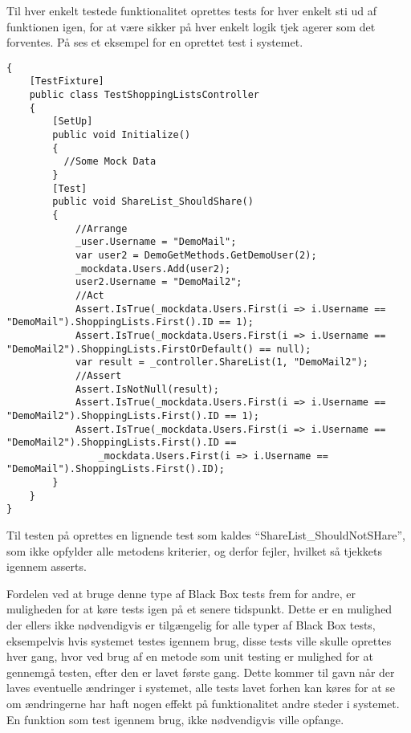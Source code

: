Til hver enkelt testede funktionalitet oprettes tests for hver enkelt sti ud af funktionen igen, for at være sikker på hver enkelt logik tjek agerer som det forventes.
På  ses et eksempel for en oprettet test i systemet.

\begin{lstlisting}
{
    [TestFixture]
    public class TestShoppingListsController
    {
		[SetUp]
        public void Initialize()
        {
          //Some Mock Data
        }
        [Test]
        public void ShareList_ShouldShare()
        {
            //Arrange
            _user.Username = "DemoMail";
            var user2 = DemoGetMethods.GetDemoUser(2);
            _mockdata.Users.Add(user2); 
            user2.Username = "DemoMail2";
            //Act
            Assert.IsTrue(_mockdata.Users.First(i => i.Username == "DemoMail").ShoppingLists.First().ID == 1);
            Assert.IsTrue(_mockdata.Users.First(i => i.Username == "DemoMail2").ShoppingLists.FirstOrDefault() == null);
            var result = _controller.ShareList(1, "DemoMail2");
            //Assert
            Assert.IsNotNull(result);
            Assert.IsTrue(_mockdata.Users.First(i => i.Username == "DemoMail2").ShoppingLists.First().ID == 1);
            Assert.IsTrue(_mockdata.Users.First(i => i.Username == "DemoMail2").ShoppingLists.First().ID == 
                _mockdata.Users.First(i => i.Username == "DemoMail").ShoppingLists.First().ID);
        }
    }
}        
\end{lstlisting}\label{lsttest}
Til testen på  oprettes en lignende test som kaldes ``ShareList_ShouldNotSHare'', som ikke opfylder alle metodens kriterier, og derfor fejler, hvilket så tjekkets igennem asserts.

Fordelen ved at bruge denne type af Black Box tests frem for andre, er muligheden for at køre tests igen på et senere tidspunkt.
Dette er en mulighed der ellers ikke nødvendigvis er tilgængelig for alle typer af Black Box tests, eksempelvis hvis systemet testes igennem brug, disse tests ville skulle oprettes hver gang, hvor ved brug af en metode som unit testing er mulighed for at gennemgå testen, efter den er lavet første gang.
Dette kommer til gavn når der laves eventuelle ændringer i systemet, alle tests lavet forhen kan køres for at se om ændringerne har haft nogen effekt på funktionalitet andre steder i systemet. 
En funktion som test igennem brug, ikke nødvendigvis ville opfange.

